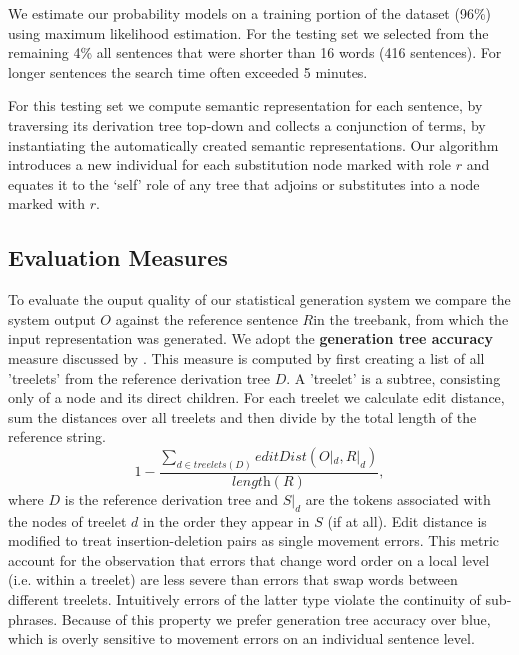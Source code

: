 We estimate our probability models on a training portion of the dataset (96\%) using maximum likelihood estimation.
For the testing set we selected from the remaining 4\% all sentences that were shorter than 16 words (416 sentences). For longer sentences the search time often exceeded 5 minutes. 

For this testing set we compute semantic representation for each sentence, by traversing its derivation tree top-down and collects a conjunction of terms, by instantiating the automatically created semantic representations. Our algorithm introduces a new individual for each substitution node marked with role $r$ and equates it to the `self' role of any tree that adjoins or substitutes into a node marked with $r$. 

\subsection{Evaluation Measures}
\label{ssec:eval-measures}
To evaluate the ouput quality of our statistical generation system we compare the system output $O$ against the reference sentence $R$in the treebank, from which the input representation was generated. We adopt the {\bf generation tree accuracy} measure discussed by \cite{bangalorerambowwhittaker2001}.
This measure is computed by first creating a list of all 'treelets' from the reference derivation tree $D$. A 'treelet' is a subtree, consisting only of a node and its direct children. For each treelet we calculate edit distance, sum the distances over all treelets and then divide by the total length of the reference string.
$$1 - \frac{\sum\limits_{d \in treelets(D)} editDist(O|_d, R|_d)}{\textit{length}(R)},$$
where $D$ is the reference derivation tree and $S|_d$ are the tokens associated with the nodes of treelet $d$ in the order they appear in $S$ (if at all). 
Edit distance is modified to treat insertion-deletion pairs as single movement errors. 
This metric account for the observation that errors that change word order on a local level (i.e. within a treelet) are less severe than errors that swap words between different treelets. Intuitively errors of the latter type violate the continuity of sub-phrases. Because of this property we prefer generation tree accuracy over {\sc blue}, which is overly sensitive to movement errors on an individual sentence level.


